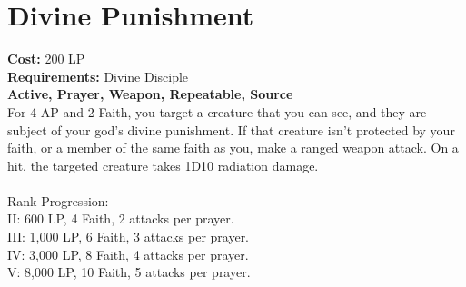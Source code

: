 \section{Divine Punishment}\label{prayer:divinePunishment}
\textbf{Cost:} 200 LP\\
\textbf{Requirements:} Divine Disciple \\
\textbf{Active, Prayer, Weapon, Repeatable, Source}\\
For 4 AP and 2 Faith, you target a creature that you can see, and they are subject of your god's divine punishment.
If that creature isn't protected by your faith, or a member of the same faith as you, make a ranged weapon attack.
On a hit, the targeted creature takes 1D10 radiation damage.\\
\\
Rank Progression:\\
II: 600 LP, 4 Faith, 2 attacks per prayer.\\
III: 1,000 LP, 6 Faith, 3 attacks per prayer.\\
IV: 3,000 LP, 8 Faith, 4 attacks per prayer.\\
V: 8,000 LP, 10 Faith, 5 attacks per prayer.\\